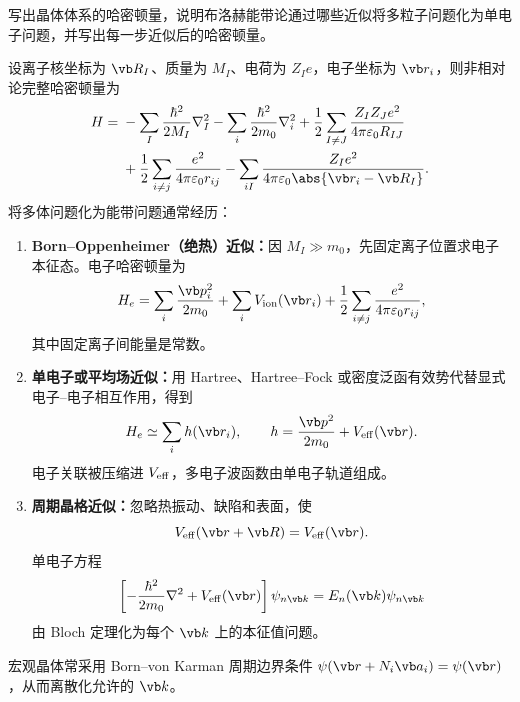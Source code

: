 \begin{question}[10 分]
写出晶体体系的哈密顿量，说明布洛赫能带论通过哪些近似将多粒子问题化为单电子问题，并写出每一步近似后的哈密顿量。


\begin{solution}
设离子核坐标为 $\vb R_I$、质量为 $M_I$、电荷为 $Z_Ie$，电子坐标为 $\vb r_i$，则非相对论完整哈密顿量为
\[
\begin{aligned}
H={}&-\sum_I\frac{\hbar^2}{2M_I}\nabla_I^2
-\sum_i\frac{\hbar^2}{2m_0}\nabla_i^2
+\frac12\sum_{I\ne J}\frac{Z_IZ_Je^2}{4\pi\varepsilon_0R_{IJ}}\\
&+\frac12\sum_{i\ne j}\frac{e^2}{4\pi\varepsilon_0r_{ij}}
-\sum_{iI}\frac{Z_Ie^2}{4\pi\varepsilon_0\abs{\vb r_i-\vb R_I}}.
\end{aligned}
\]
将多体问题化为能带问题通常经历：
\begin{enumerate}
  \item \textbf{Born--Oppenheimer（绝热）近似：}因 $M_I\gg m_0$，先固定离子位置求电子本征态。电子哈密顿量为
  \[
    H_e=\sum_i\frac{\vb p_i^2}{2m_0}+\sum_iV_{\rm ion}(\vb r_i)
    +\frac12\sum_{i\ne j}\frac{e^2}{4\pi\varepsilon_0r_{ij}},
  \]
  其中固定离子间能量是常数。
  \item \textbf{单电子或平均场近似：}用 Hartree、Hartree--Fock 或密度泛函有效势代替显式电子--电子相互作用，得到
  \[
    H_e\simeq\sum_i h(\vb r_i),\qquad
    h=\frac{\vb p^2}{2m_0}+V_{\rm eff}(\vb r).
  \]
  电子关联被压缩进 $V_{\rm eff}$，多电子波函数由单电子轨道组成。
  \item \textbf{周期晶格近似：}忽略热振动、缺陷和表面，使
  \[
    V_{\rm eff}(\vb r+\vb R)=V_{\rm eff}(\vb r).
  \]
  单电子方程
  \[
    \left[-\frac{\hbar^2}{2m_0}\nabla^2+V_{\rm eff}(\vb r)\right]
    \psi_{n\vb k}=E_n(\vb k)\psi_{n\vb k}
  \]
  由 Bloch 定理化为每个 $\vb k$ 上的本征值问题。
\end{enumerate}
宏观晶体常采用 Born--von Karman 周期边界条件
$\psi(\vb r+N_i\vb a_i)=\psi(\vb r)$，从而离散化允许的 $\vb k$。
\end{solution}
\end{question}

